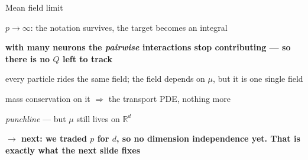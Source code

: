 \documentclass[aspectratio=169,11pt]{beamer}
\begin{document}
\begin{frame}{Mean field limit}
{\begin{notelist}
    \item $p \to \infty$: the notation survives, the target becomes an integral
    \item \textbf{with many neurons the \emph{pairwise} interactions stop
      contributing --- so there is no $Q$ left to track}
    \item every particle rides the same field; the field depends on $\mu$, but it is
      one single field
    \item mass conservation on it $\Rightarrow$ the transport PDE, nothing more
    \item \emph{punchline} --- but $\mu$ still lives on $\mathbb{R}^d$
    \item \textbf{$\to$ next: we traded $p$ for $d$, so no dimension independence
      yet. That is exactly what the next slide fixes}
  \end{notelist}}
\end{frame}
\end{document}

